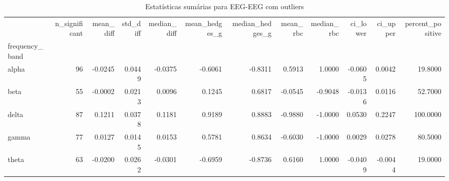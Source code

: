 \begin{table}[htbp]
\centering
\begin{tabular}{lrrrrrrrrrrr}
\toprule
 & n_significant & mean_diff & std_diff & median_diff & mean_hedges_g & median_hedges_g & mean_rbc & median_rbc & ci_lower & ci_upper & percent_positive \\
frequency_band &  &  &  &  &  &  &  &  &  &  &  \\
\midrule
alpha & 96 & -0.0245 & 0.0449 & -0.0375 & -0.6061 & -0.8311 & 0.5913 & 1.0000 & -0.0605 & 0.0042 & 19.8000 \\
beta & 55 & -0.0002 & 0.0213 & 0.0096 & 0.1245 & 0.6817 & -0.0545 & -0.9048 & -0.0136 & 0.0116 & 52.7000 \\
delta & 87 & 0.1211 & 0.0378 & 0.1181 & 0.9189 & 0.8883 & -0.9880 & -1.0000 & 0.0530 & 0.2247 & 100.0000 \\
gamma & 77 & 0.0127 & 0.0145 & 0.0153 & 0.5781 & 0.8634 & -0.6030 & -1.0000 & 0.0029 & 0.0278 & 80.5000 \\
theta & 63 & -0.0200 & 0.0262 & -0.0301 & -0.6959 & -0.8736 & 0.6160 & 1.0000 & -0.0409 & -0.0044 & 19.0000 \\
\bottomrule
\end{tabular}
\caption{Estatísticas sumárias para EEG-EEG com outliers}
\label{tab:summary_eeg_eeg_with}
\end{table}
